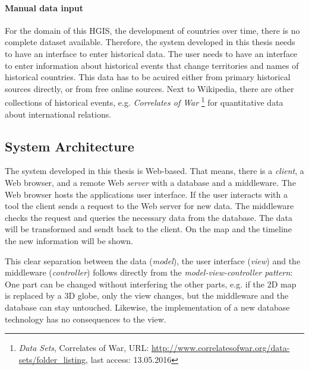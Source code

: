 

\paragraph{Manual data input} %
\label{par:manual_data_input}

For the domain of this HGIS, the development of countries over time, there is no complete dataset available. Therefore, the system developed in this thesis needs to have an interface to enter historical data. The user needs to have an interface to enter information about historical events that change territories and names of historical countries. This data has to be acuired either from primary historical sources directly, or from free online sources. Next to Wikipedia, there are other collections of historical events, e.g. \emph{Correlates of War}
\footnote{
  \textit{Data Sets},
  Correlates of War,
  URL: \url{http://www.correlatesofwar.org/data-sets/folder_listing},
  last access: 13.05.2016
}
for quantitative data about international relations.


\subsection{System Architecture} %
\label{sub:system_architecture}


The system developed in this thesis is Web-based. That means, there is a \emph{client}, a Web browser, and a remote Web \emph{server} with a database and a middleware. The Web browser hosts the applications user interface. If the user interacts with a tool the client sends a request to the Web server for new data. The middleware checks the request and queries the necessary data from the database. The data will be transformed and sendt back to the client. On the map and the timeline the new information will be shown.

This clear separation between the data (\emph{model}), the user interface (\emph{view}) and the middleware (\emph{controller}) follows directly from the \emph{model-view-controller pattern}: One part can be changed without interfering the other parts, e.g. if the 2D map is replaced by a 3D globe, only the view changes, but the middleware and the database can stay untouched. Likewise, the implementation of a new database technology has no consequences to the view.


